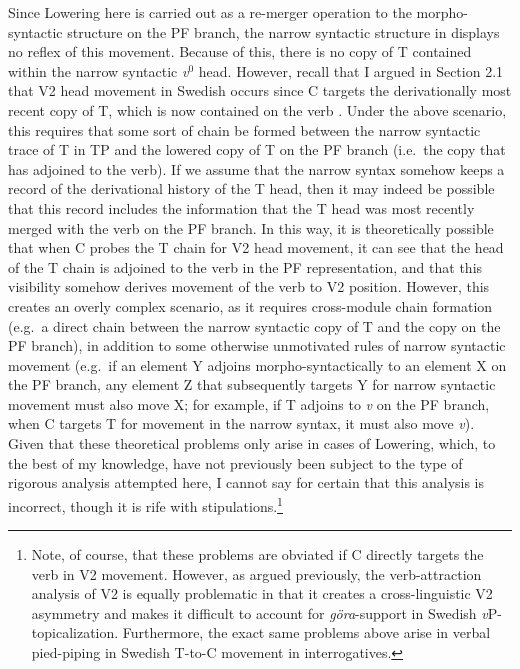 \onehalfspacing
\noindent
Since Lowering here is carried out as a re-merger operation to the morpho-syntactic structure on the PF branch, the narrow syntactic structure in \Last[c] displays no reflex of this movement. Because of this, there is no copy of T contained within the narrow syntactic {\it v}$^{0}$ head. However, recall that I argued in Section 2.1 that V2 head movement in Swedish occurs since C\raisebox{-4pt}{\small{[-T]}} targets the derivationally most recent copy of T, which is now contained on the verb \Last[b]. Under the above scenario, this requires that some sort of chain be formed between the narrow syntactic trace of T in TP and the lowered copy of T on the PF branch (i.e.\ the copy that has adjoined to the verb). If we assume that the narrow syntax somehow keeps a record of the derivational history of the T head, then it may indeed be possible that this record includes the information that the T head was most recently merged with the verb on the PF branch. In this way, it is theoretically possible that when C\raisebox{-4pt}{\small{[-T]}} probes the T chain for V2 head movement, it can see that the head of the T chain is adjoined to the verb in the PF representation, and that this visibility somehow derives movement of the verb to V2 position. However, this creates an overly complex scenario, as it requires cross-module chain formation (e.g.\ a direct chain between the narrow syntactic copy of T and the copy on the PF branch), in addition to some otherwise unmotivated rules of narrow syntactic movement (e.g.\ if an element Y adjoins morpho-syntactically to an element X on the PF branch, any element Z that subsequently targets Y for narrow syntactic movement must also move X; for example, if T adjoins to {\it v} on the PF branch, when C targets T for movement in the narrow syntax, it must also move {\it v}). Given that these theoretical problems only arise in cases of Lowering, which, to the best of my knowledge, have not previously been subject to the type of rigorous analysis attempted here, I cannot say for certain that this analysis is incorrect, though it is rife with stipulations.\footnote{Note, of course, that these problems are obviated if C directly targets the verb in V2 movement. However, as argued previously, the verb-attraction analysis of V2 is equally problematic in that it creates a cross-linguistic V2 asymmetry and makes it difficult to account for {\it g\"{o}ra}-support in Swedish {\it v}P-topicalization. Furthermore, the exact same problems above arise in verbal pied-piping in Swedish T-to-C movement in interrogatives.}

